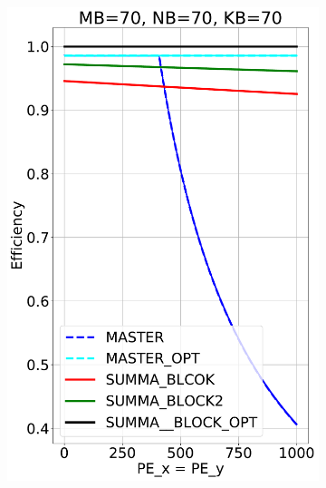 \begin{figure}[t!]
  \centering
  \begin{subfigure}{0.32\columnwidth}
    \includegraphics[width=\linewidth]{figures/efficiency_cost_block_70_70_70.pdf}
  \end{subfigure}
  \hfill
  \begin{subfigure}{0.32\columnwidth}

\end{subfigure}
\end{figure}
